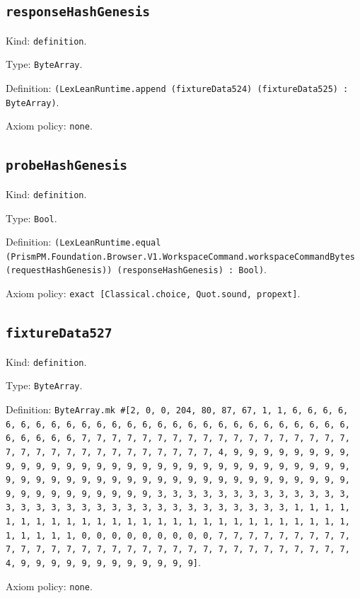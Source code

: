 \documentclass[11pt]{article}
\begin{document}
\subsection*{\texttt{responseHashGenesis}}
\noindent Kind: \texttt{definition}.\par
\noindent Type: \texttt{ByteArray}.\par
\noindent Definition: \texttt{(LexLeanRuntime.append (fixtureData524) (fixtureData525) : ByteArray)}.\par
\noindent Axiom policy: \texttt{none}.\par
\subsection*{\texttt{probeHashGenesis}}
\noindent Kind: \texttt{definition}.\par
\noindent Type: \texttt{Bool}.\par
\noindent Definition: \texttt{(LexLeanRuntime.equal (PrismPM.Foundation.Browser.V1.WorkspaceCommand.workspaceCommandBytes (requestHashGenesis)) (responseHashGenesis) : Bool)}.\par
\noindent Axiom policy: \texttt{exact [Classical.choice, Quot.sound, propext]}.\par
\subsection*{\texttt{fixtureData527}}
\noindent Kind: \texttt{definition}.\par
\noindent Type: \texttt{ByteArray}.\par
\noindent Definition: \texttt{ByteArray.mk \#[2, 0, 0, 204, 80, 87, 67, 1, 1, 6, 6, 6, 6, 6, 6, 6, 6, 6, 6, 6, 6, 6, 6, 6, 6, 6, 6, 6, 6, 6, 6, 6, 6, 6, 6, 6, 6, 6, 6, 6, 6, 7, 7, 7, 7, 7, 7, 7, 7, 7, 7, 7, 7, 7, 7, 7, 7, 7, 7, 7, 7, 7, 7, 7, 7, 7, 7, 7, 7, 7, 7, 7, 7, 4, 9, 9, 9, 9, 9, 9, 9, 9, 9, 9, 9, 9, 9, 9, 9, 9, 9, 9, 9, 9, 9, 9, 9, 9, 9, 9, 9, 9, 9, 9, 9, 9, 9, 9, 9, 9, 9, 9, 9, 9, 9, 9, 9, 9, 9, 9, 9, 9, 9, 9, 9, 9, 9, 9, 9, 9, 9, 9, 9, 9, 9, 9, 9, 9, 3, 3, 3, 3, 3, 3, 3, 3, 3, 3, 3, 3, 3, 3, 3, 3, 3, 3, 3, 3, 3, 3, 3, 3, 3, 3, 3, 3, 3, 3, 3, 3, 1, 1, 1, 1, 1, 1, 1, 1, 1, 1, 1, 1, 1, 1, 1, 1, 1, 1, 1, 1, 1, 1, 1, 1, 1, 1, 1, 1, 1, 1, 1, 1, 0, 0, 0, 0, 0, 0, 0, 0, 0, 7, 7, 7, 7, 7, 7, 7, 7, 7, 7, 7, 7, 7, 7, 7, 7, 7, 7, 7, 7, 7, 7, 7, 7, 7, 7, 7, 7, 7, 7, 7, 7, 4, 9, 9, 9, 9, 9, 9, 9, 9, 9, 9, 9, 9]}.\par
\noindent Axiom policy: \texttt{none}.\par
\end{document}
